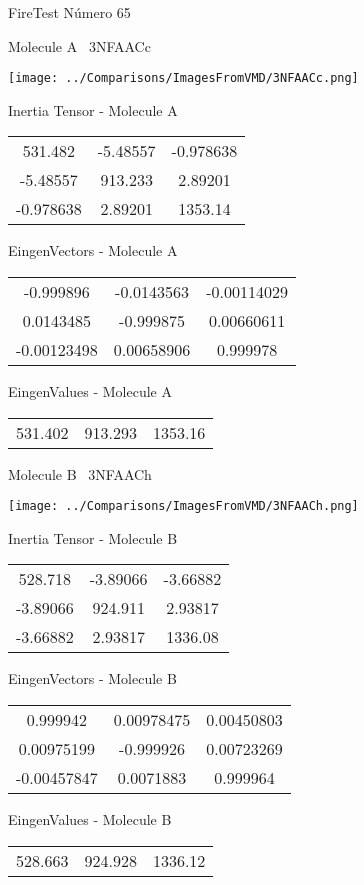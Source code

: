 \vtab[-3cm]
\begin{center}
{\large FireTest \tab Número 65}
\end{center}
\begin{multicols}{2}
\begin{center}

Molecule A \
3NFAACc

\texttt{[image: ../Comparisons/ImagesFromVMD/3NFAACc.png]}

Inertia Tensor - Molecule A \\
\begin{tabular}{|c c c|}
531.482	 & 	-5.48557	 & 	-0.978638	 \\
-5.48557	 & 	913.233	 & 	2.89201	 \\
-0.978638	 & 	2.89201	 & 	1353.14
\end{tabular}

\vtab
 EingenVectors - Molecule A     \\
\begin{tabular}{|c c c|}
-0.999896	 & 	-0.0143563	 & 	-0.00114029	 \\
0.0143485	 & 	-0.999875	 & 	0.00660611	 \\
-0.00123498	 & 	0.00658906	 & 	0.999978
\end{tabular}

\vtab
 EingenValues - Molecule A     \\
\begin{tabular}{|c c c|}
531.402	 & 	913.293	 & 	1353.16	 \\
\end{tabular}
\columnbreak

Molecule B \
3NFAACh

\texttt{[image: ../Comparisons/ImagesFromVMD/3NFAACh.png]}

Inertia Tensor - Molecule B \\
\begin{tabular}{|c c c|}
528.718	 & 	-3.89066	 & 	-3.66882	 \\
-3.89066	 & 	924.911	 & 	2.93817	 \\
-3.66882	 & 	2.93817	 & 	1336.08
\end{tabular}

\vtab
 EingenVectors - Molecule B     \\
\begin{tabular}{|c c c|}
0.999942	 & 	0.00978475	 & 	0.00450803	 \\
0.00975199	 & 	-0.999926	 & 	0.00723269	 \\
-0.00457847	 & 	0.0071883	 & 	0.999964
\end{tabular}

\vtab
 EingenValues - Molecule B     \\
\begin{tabular}{|c c c|}
528.663	 & 	924.928	 & 	1336.12	 \\
\end{tabular}

\end{center}
\end{multicols}

